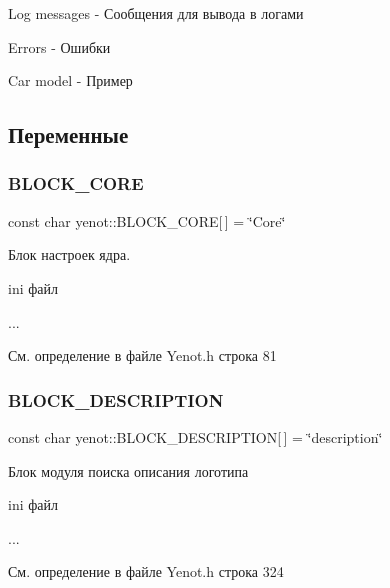Log messages -\/ Сообщения для вывода в логами

Errors -\/ Ошибки

Car model -\/ Пример 

\subsection{Переменные}
\mbox{\label{namespaceyenot_a2172a9f506029215b790a51a4023e1ac}} 
\subsubsection{\texorpdfstring{B\+L\+O\+C\+K\+\_\+\+C\+O\+RE}{BLOCK\_CORE}}
{\footnotesize\ttfamily const char yenot\+::\+B\+L\+O\+C\+K\+\_\+\+C\+O\+RE\mbox{[}$\,$\mbox{]} = \char`\"{}Core\char`\"{}}

Блок настроек ядра.

ini файл 
\begin{DoxyCode}
[Core]
...
\end{DoxyCode}
 

См. определение в файле Yenot.\+h строка 81

\mbox{\label{namespaceyenot_abc55bd8e208d61e4d5055b305d998624}} 
\subsubsection{\texorpdfstring{B\+L\+O\+C\+K\+\_\+\+D\+E\+S\+C\+R\+I\+P\+T\+I\+ON}{BLOCK\_DESCRIPTION}}
{\footnotesize\ttfamily const char yenot\+::\+B\+L\+O\+C\+K\+\_\+\+D\+E\+S\+C\+R\+I\+P\+T\+I\+ON\mbox{[}$\,$\mbox{]} = \char`\"{}description\char`\"{}}

Блок модуля поиска описания логотипа

ini файл 
\begin{DoxyCode}
...
\end{DoxyCode}
 

См. определение в файле Yenot.\+h строка 324

